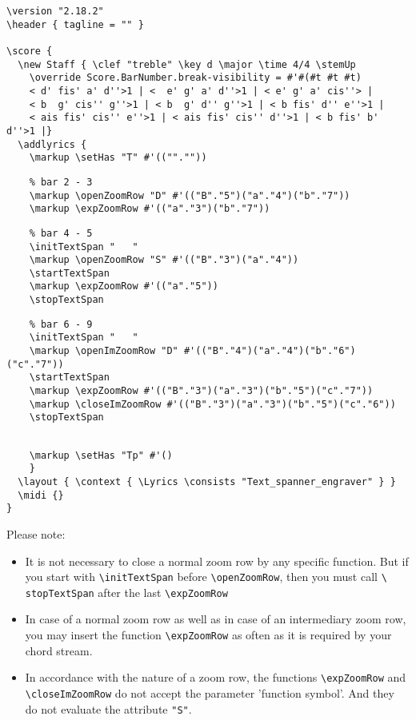 \documentclass[
  DIV=calc,
  BCOR=5mm,
  12pt,
  headings=small,
  oneside,
  abstract=true,
  toc=bib,
  xcolor=dvipsnames,
  openany,
  english]{scrartcl}
\begin{document}
\begin{scriptsize}
\begin{verbatim}
\version "2.18.2"
\header { tagline = "" }

\score {
  \new Staff { \clef "treble" \key d \major \time 4/4 \stemUp
    \override Score.BarNumber.break-visibility = #'#(#t #t #t)
    < d' fis' a' d''>1 | <  e' g' a' d''>1 | < e' g' a' cis''> |
    < b  g' cis'' g''>1 | < b  g' d'' g''>1 | < b fis' d'' e''>1 |
    < ais fis' cis'' e''>1 | < ais fis' cis'' d''>1 | < b fis' b' d''>1 |}
  \addlyrics {
    \markup \setHas "T" #'(("".""))
\end{verbatim}
\color{red}
\begin{verbatim}
    % bar 2 - 3
    \markup \openZoomRow "D" #'(("B"."5")("a"."4")("b"."7"))
    \markup \expZoomRow #'(("a"."3")("b"."7"))
\end{verbatim}
\color{blue}
\begin{verbatim}
    % bar 4 - 5
    \initTextSpan "   "
    \markup \openZoomRow "S" #'(("B"."3")("a"."4"))
    \startTextSpan
    \markup \expZoomRow #'(("a"."5"))
    \stopTextSpan
\end{verbatim}
\color{magenta}
\begin{verbatim}
    % bar 6 - 9
    \initTextSpan "   "
    \markup \openImZoomRow "D" #'(("B"."4")("a"."4")("b"."6")("c"."7"))
    \startTextSpan
    \markup \expZoomRow #'(("B"."3")("a"."3")("b"."5")("c"."7"))
    \markup \closeImZoomRow #'(("B"."3")("a"."3")("b"."5")("c"."6"))
    \stopTextSpan
\end{verbatim}
\color{black}
\begin{verbatim}

    \markup \setHas "Tp" #'()
    }
  \layout { \context { \Lyrics \consists "Text_spanner_engraver" } }
  \midi {}
}
\end{verbatim}
\end{scriptsize}

Please note:
\begin{itemize}
  \item It is not necessary to close a normal zoom row by any specific function.
  But if you start with \texttt{\textbackslash initTextSpan} before
  \texttt{\textbackslash openZoomRow}, then you must call \texttt{\textbackslash
  stopTextSpan} after the last \texttt{\textbackslash expZoomRow}
  \item In case of a normal zoom row as well as in case of an intermediary zoom
  row, you may insert the function \texttt{\textbackslash expZoomRow} as often as
  it is required by your chord stream.
  \item In accordance with the nature of a zoom row, the functions
  \texttt{\textbackslash expZoomRow} and \texttt{\textbackslash closeImZoomRow}
  do not accept the parameter 'function symbol'. And they do not evaluate the
  attribute \texttt{"S"}.
\end{itemize}
\end{document}
